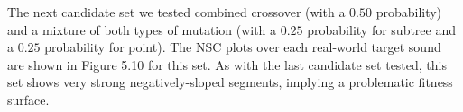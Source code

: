 \documentclass[a4paper,12pt]{report} 	%
\numberwithin{figure}{chapter}
\numberwithin{table}{chapter}
\numberwithin{equation}{chapter}
\begin{document}
\begin{flushleft}
The next candidate set we tested combined crossover (with a $0.50$ probability) and a mixture of both types of mutation (with a $0.25$ probability for subtree and a $0.25$ probability for point). The NSC plots over each real-world target sound are shown in Figure 5.10 for this set.
As with the last candidate set tested, this set shows very strong negatively-sloped segments, implying a problematic fitness surface.


\end{flushleft}
\end{document}
